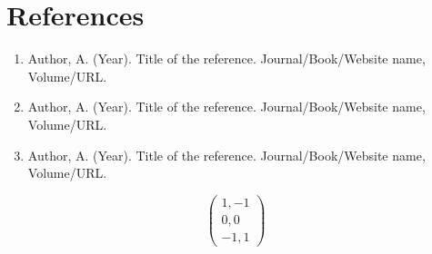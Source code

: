 \documentclass[a4paper]{article}
\begin{document}
\section{References}
\begin{enumerate}
    \item Author, A. (Year). Title of the reference. Journal/Book/Website name, Volume/URL.
    \item Author, A. (Year). Title of the reference. Journal/Book/Website name, Volume/URL.
    \item Author, A. (Year). Title of the reference. Journal/Book/Website name, Volume/URL.
\end{enumerate}


\[
\left(
\begin{array}{ccc}
  {1}  , {-1}   \\
  {0},   {0}   \\
 {-1}, {1}   
\end{array}
\right)
\]


\end{document}
